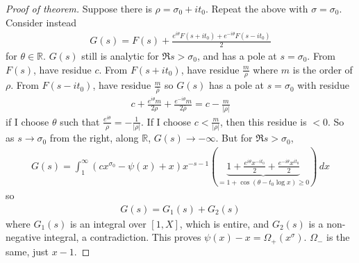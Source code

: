 \documentclass{article}
\newcommand{\1}{\mathbbm{1}}
\begin{document}
\begin{proof}[Proof of theorem]
  Suppose there is $\rho = \sigma_0 + it_0$. Repeat the above with $\sigma = \sigma_0$.
  Consider instead
  \begin{align*}
    G(s) = F(s) + \frac{e^{i\theta} F(s+it_0) + e^{-i\theta}F(s-it_0)}2
  \end{align*}
  for $\theta \in \mathbb{R}$.
  $G(s)$ still is analytic for $\Re s > \sigma_0$, and has a pole at $s=\sigma_0$. From $F(s)$, have residue $c$.
  From $F(s+it_0)$, have residue $\frac{m}{\rho}$ where $m$ is the order of $\rho$.
  From $F(s-it_0)$, have residue $\frac{m}{\bar{\rho}}$
  so $G(s)$ has a pole at $s=\sigma_0$ with residue
  \begin{align*}
    c + \frac{e^{i \theta} m}{2\rho} + \frac{e^{-i\theta}m}{2\bar{\rho}} = c - \frac{m}{|\rho|}
  \end{align*}
  if I choose $\theta$ such that $\frac{e^{i\theta}}{\rho} = -\frac{1}{|\rho|}$.
  If I choose $c < \frac{m}{|\rho|}$, then this residue is $< 0$.
  So as $s \to \sigma_0$ from the right, along $\mathbb{R}$, $G(s) \to -\infty$.
  But for $\Re s > \sigma_0$,
  \begin{align*}
    G(s) = \int_1^\infty (c x^{\sigma_0} - \psi(x) + x)x^{-s-1}\left(\underbrace{1 + \frac{e^{i\theta} x^{-it_0}}{2} + \frac{e^{-i\theta} x^{it_0}}{2}}_{=1 + \cos(\theta - t_0 \log x) \geq 0}\right) \,dx
  \end{align*}
  so
  \begin{align*}
    G(s) = G_1(s) + G_2(s)
  \end{align*}
  where $G_1(s)$ is an integral over $[1,X]$, which is entire, and $G_2(s)$ is a non-negative integral, a contradiction.
  This proves $\psi(x) - x = \Omega_+(x^\sigma)$.
  $\Omega_-$ is the same, just $x-1$.
\end{proof}
\clearpage
\printnomenclature
\printindex
\end{document}
